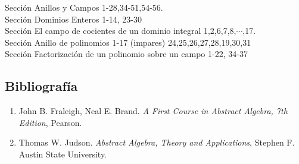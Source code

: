 
\usepackage{nopageno}  


	Sección   Anillos y Campos 1-28,34-51,54-56. \\
	Sección  Dominios Enteros 1-14, 23-30 \\
	Sección   El campo de cocientes de un dominio integral 1,2,6,7,8,$\cdots$,17. \\
	Sección  Anillo de polinomios 1-17 (impares) 24,25,26,27,28,19,30,31 \\
	Sección  Factorización de un polinomio sobre un campo  1-22, 34-37 \\
	


\subsection*{Bibliografía}

\begin{enumerate}
	\item 	John B. Fraleigh, Neal E. Brand. \textit{A First Course in Abstract Algebra, 7th Edition},  Pearson.
	\item 	Thomas W. Judson. \textit{Abstract Algebra, Theory and Applications}, Stephen F. Austin State University.
\end{enumerate}



